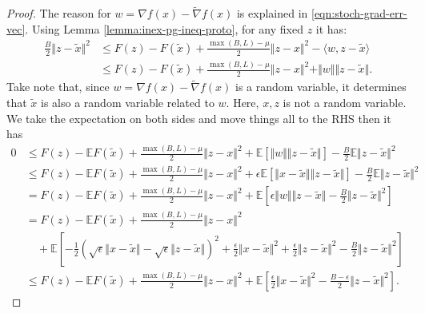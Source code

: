 \documentclass[12pt]{article}
\newcommand{\expect}{\ensuremath{\mathbb E}}
\begin{document}
        \begin{proof}
            The reason for $w = \nabla f(x) - \tilde \nabla f(x)$ is explained in \eqref{eqn:stoch-grad-err-vec}. 
            Using Lemma \ref{lemma:inex-pg-ineq-proto}, for any fixed $z$ it has: 
            \begin{align*}
                \frac{B}{2}\Vert z - \tilde x\Vert^2 &\le 
                F(z) - F(\tilde x) + \frac{\max(B, L) - \mu}{2}\Vert z - x\Vert^2 - \langle w, z - \tilde x\rangle
                \\
                &\le 
                F(z) - F(\tilde x) + \frac{\max(B, L) - \mu}{2}\Vert z - x\Vert^2 + \Vert w\Vert\Vert z - \tilde x\Vert. 
            \end{align*}
            Take note that, since $w = \nabla f(x) - \tilde \nabla f(x)$ is a random variable, it determines that $\tilde x$ is also a random variable related to $w$. 
            Here, $x, z$ is not a random variable. 
            We take the expectation on both sides and move things all to the RHS then it has 
            \begin{align*}
                0&\le 
                F(z) - \expect F(\tilde x) + \frac{\max(B, L) - \mu}{2}\Vert z - x\Vert^2 
                + \expect\left[
                    \Vert w\Vert\Vert z - \tilde x\Vert
                \right]
                - \frac{B}{2}\expect \Vert z - \tilde x\Vert^2
                \\
                &\le F(z) - \expect F(\tilde x) + \frac{\max(B, L) - \mu}{2}\Vert z - x\Vert^2 
                + \epsilon \expect \left[
                    \Vert x - \tilde x\Vert\Vert z - \tilde x\Vert
                \right]
                - \frac{B}{2}\expect \Vert z - \tilde x\Vert^2
                \\
                &= 
                F(z) - \expect F(\tilde x) + \frac{\max(B, L) - \mu}{2}\Vert z - x\Vert^2 
                + \expect\left[
                    \epsilon\Vert w\Vert\Vert z - \tilde x\Vert
                    - \frac{B}{2} \Vert z - \tilde x\Vert^2
                \right]
                \\
                &=
                F(z) - \expect F(\tilde x) + \frac{\max(B, L) - \mu}{2}\Vert z - x\Vert^2 
                    \\ &\quad 
                    + \expect\left[
                        - \frac{1}{2}\left(
                            \sqrt{\epsilon}\Vert x - \tilde x\Vert - \sqrt{\epsilon}\Vert z - \tilde x\Vert
                        \right)^2
                        + \frac{\epsilon}{2}\Vert x - \tilde x\Vert^2 + \frac{\epsilon}{2}\Vert z - \tilde x\Vert^2
                        - \frac{B}{2} \Vert z - \tilde x\Vert^2
                    \right]
                \\
                &\le 
                F(z) - \expect F(\tilde x) + \frac{\max(B, L) - \mu}{2}\Vert z - x\Vert^2 
                + \expect\left[
                    \frac{\epsilon}{2}\Vert x - \tilde x\Vert^2
                    - \frac{B - \epsilon}{2} \Vert z - \tilde x\Vert^2
                \right]. 
            \end{align*}
        \end{proof}
\end{document}
